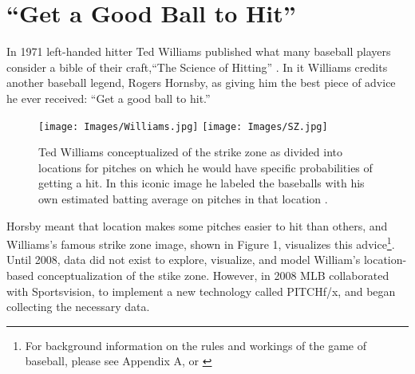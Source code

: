 % 
% 
% 
% 
% 
% 
% 
% 
% 
% 
% 
% 
% 
% 

\section{``Get a Good Ball to Hit''}
In 1971 left-handed hitter Ted Williams published what many baseball players consider a bible of their craft,``The Science of Hitting'' \citep{Williams1971}. In it Williams credits another baseball legend, Rogers Hornsby, as giving him the best piece of advice he ever received: ``Get a good ball to hit.''
        \begin{figure}[H]
      	\centering
      	\texttt{[image: Images/Williams.jpg]} 
      	\texttt{[image: Images/SZ.jpg]}
      	\caption{Ted Williams conceptualized of the strike zone as divided into locations for pitches on which he would have specific probabilities of getting a hit. In this iconic image he labeled the baseballs with his own estimated batting average on pitches in that location \citep{Williams1971}.}
      	\end{figure} 
Horsby meant that location makes some pitches easier to hit than others, and  Williams's famous strike zone image, shown in Figure 1, visualizes this advice\footnote{For background information on the rules and workings of the game of baseball, please see Appendix A, or \citep{Wiki}}. Until 2008, data did not exist to explore, visualize, and model William's location-based conceptualization of the stike zone. However, in 2008 MLB collaborated with Sportsvision, to implement a new technology called PITCHf/x\textsuperscript{\textregistered}, and began collecting the necessary data.


